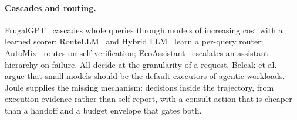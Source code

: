 \paragraph{Cascades and routing.}
FrugalGPT~\cite{chen2023frugalgpt} cascades whole queries through models of increasing cost with a learned scorer;
RouteLLM~\cite{ong2024routellm} and Hybrid LLM~\cite{ding2024hybrid} learn a per-query router;
AutoMix~\cite{madaan2023automix} routes on self-verification;
EcoAssistant~\cite{zhang2023ecoassistant} escalates an assistant hierarchy on failure.
All decide at the granularity of a request.
Belcak et al.~\cite{belcak2025slm} argue that small models should be the default executors of agentic workloads.
Joule supplies the missing mechanism: decisions inside the trajectory, from execution evidence rather than self-report, with a consult action that is cheaper than a handoff and a budget envelope that gates both.
